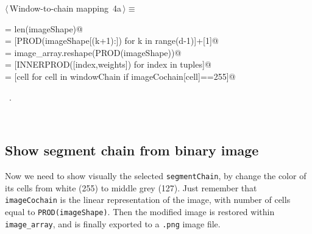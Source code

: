 \documentclass[11pt,oneside]{article}	%
\begin{document}
\begin{flushleft} \small
\begin{minipage}{\linewidth} \label{scrap6}
\protect{}$\langle\,$Window-to-chain mapping\nobreak\ {\footnotesize 4a}$\,\rangle\equiv$
\vspace{-1ex}
\begin{list}{}{} \item
\mbox{}\verb@d = len(imageShape)@\\
\mbox{}\verb@weights = [PROD(imageShape[(k+1):]) for k in range(d-1)]+[1]@\\
\mbox{}\verb@imageCochain = image_array.reshape(PROD(imageShape))@\\
\mbox{}\verb@windowChain = [INNERPROD([index,weights]) for index in tuples]@\\
\mbox{}\verb@segmentChain = [cell for cell in windowChain if imageCochain[cell]==255]@\\
\mbox{}\verb@@{\NWsep}
\end{list}
\vspace{-1ex}
\footnotesize\addtolength{\baselineskip}{-1ex}
\begin{list}{}{\setlength{\itemsep}{-\parsep}\setlength{\itemindent}{-\leftmargin}}
\item \NWtxtMacroRefIn\ .
\end{list}
\end{minipage}\\[4ex]
\end{flushleft}

\subsection{Show segment chain from binary image}

Now we need to show visually the selected \texttt{segmentChain}, by change the color of its cells from white (255) to middle grey (127). Just remember that \texttt{imageCochain} is the linear representation of the image, with number of cells equal to \texttt{PROD(imageShape)}. Then the modified image is restored within \texttt{image\_array}, and is finally exported to a \texttt{.png} image file.
\end{document}
